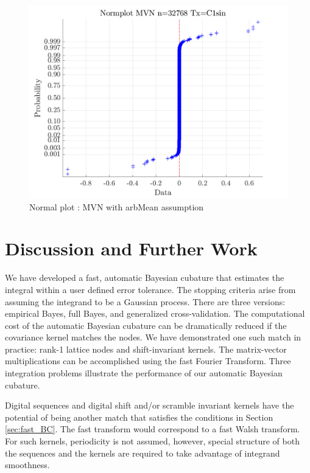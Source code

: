 \documentclass[twocolumn]{svjour3}          %
\begin{document}
\begin{figure}
	\centering
	\includegraphics[width=0.9\linewidth]{"figures/arbMean/MVN/C1sin/MVN Normplot d_2 bernoulli_2 Period_C1sin n_32768"}
	\caption{Normal plot : MVN with arbMean assumption}
	\label{fig:mvn-normplot}
\end{figure}

\fi




\section{Discussion and Further Work}

We have developed a fast, automatic Bayesian cubature that estimates the integral within a user defined error tolerance.  The stopping criteria arise from assuming the integrand to be a Gaussian process.  There are three versions:  empirical Bayes, full Bayes, and generalized cross-validation.  The computational cost of the automatic Bayesian cubature can be dramatically reduced if the covariance kernel matches the nodes.  We have demonstrated one such match in practice: rank-1 lattice nodes and shift-invariant kernels.  The matrix-vector multiplications can be accomplished using the fast Fourier Transform.  Three integration problems illustrate the performance of our automatic Bayesian cubature.  

Digital sequences and digital shift and/or scramble invariant kernels have the potential of being another match that satisfies the conditions in Section \ref{sec:fast_BC}.  The fast transform would correspond to a fast Walsh transform.  For such kernels, periodicity is not assumed, however, special structure of both the sequences and the kernels are required to take advantage of integrand smoothness.
\end{document}
